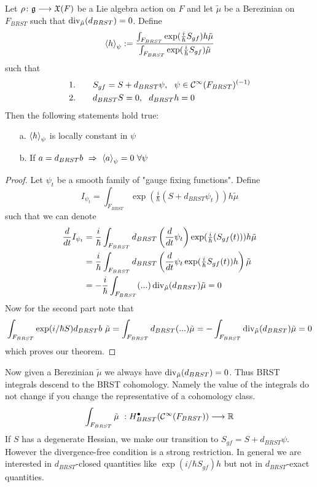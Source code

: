 \begin{theo}[BRST]
  Let $\rho \colon \mathfrak{g} \longrightarrow \mathfrak{X}(F)$ be a Lie algebra action on $F$ and let $\tilde{\mu}$ be a Berezinian on $F_{BRST}$ such that $\operatorname{div}_{\tilde{\mu}}(d_{BRST}) = 0$. Define
  \begin{equation}\left\langle h \right\rangle_\psi := \frac{\int_{F_{BRST}} \exp(\tfrac{i}{\hbar} S_{gf})h \tilde{\mu}}{\int_{F_{BRST}} \exp(\tfrac{i}{\hbar} S_{gf})\tilde{\mu}} \end{equation}
  such that
  \begin{align}
      &1. \quad \quad S_{gf} = S + d_{BRST} \psi, \ \ \psi \in \mathcal{C}^{\infty}(F_{BRST})^{(-1)}\\
      &2. \quad \quad d_{BRST} S = 0, \ \ d_{BRST} h = 0
  \end{align}
  Then the following statements hold true:
  \begin{itemize}
    \item[a.] $\left\langle h \right\rangle_\psi$ is locally constant in $\psi$
    \item[b.] If $a = d_{BRST} b \ \Rightarrow \ \left\langle a \right\rangle_\psi = 0 \ \forall \psi$
  \end{itemize}
\begin{proof}
  Let $\psi_t$ be a smooth family of "gauge fixing functions". Define
  \begin{equation}
    I_{\psi_t} = \int_{F_{BRST}} \exp(\tfrac{i}{\hbar} (S+ d_{BRST} \psi_t)) h \tilde{\mu}
  \end{equation}
  such that we can denote
  \begin{align}
    \frac{d }{d t} I_{\psi_t} &= \frac{i}{\hbar} \int_{F_{BRST}} d_{BRST}\left(\frac{d }{d t}\psi_t\right) \exp(\tfrac{i}{\hbar} (S_{gf}(t))) h \tilde{\mu} \\
    &= \frac{i}{\hbar} \int_{F_{BRST}} d_{BRST} \left( \frac{d }{d t}\psi_t \exp(\tfrac{i}{\hbar} S_{gf}(t)) h \right) \tilde{\mu} \\
    &= - \frac{i}{\hbar} \int_{F_{BRST}} (...) \operatorname{div}_{\tilde{\mu}}(d_{BRST}) \tilde{\mu} = 0
  \end{align}
  Now for the second part note that
  \begin{align}
    \int_{F_{BRST}} \exp(i/\hbar S) d_{BRST} b \ \tilde{\mu} = \int_{F_{BRST}} d_{BRST} (...) \tilde{\mu} = - \int_{F_{BRST}} \operatorname{div}_{\tilde{\mu}}(d_{BRST}) \tilde{\mu} = 0
  \end{align}
  which proves our theorem.
\end{proof}
\end{theo}

Now given a Berezinian $\tilde{\mu}$ we always have $\operatorname{div}_{\tilde{\mu}}(d_{BRST}) = 0$. Thus BRST integrals descend to the BRST cohomology. Namely the value of the integrals do not change if you change the representative of a cohomology class.
\begin{equation}
  \int_{F_{BRST}} \tilde{\mu} \ : H^\bullet_{BRST} (\mathcal{C}^{\infty}(F_{BRST})) \longrightarrow \mathbb{R}
\end{equation}
If $S$ has a degenerate Hessian, we make our transition to $S_{gf} = S + d_{BRST} \psi$. However the divergence-free condition is a strong restriction. In general we are interested in $d_{BRST}$-closed quantities like $\exp(i/ \hbar S_{gf}) h$ but not in $d_{BRST}$-exact quantities.\\

